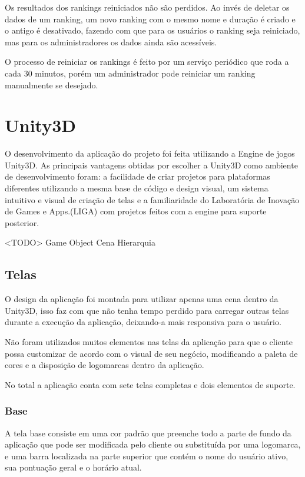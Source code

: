 Os resultados dos rankings reiniciados não são perdidos. Ao invés de deletar os dados de um ranking, um novo ranking com o mesmo nome e duração é criado e o antigo é desativado, fazendo com que para os usuários o ranking seja reiniciado, mas para os administradores os dados ainda são acessíveis.

O processo de reiniciar os rankings é feito por um serviço periódico que roda a cada 30 minutos, porém um administrador pode reiniciar um ranking manualmente se desejado.

\section{Unity3D}
\label{sec:unity3d}

O desenvolvimento da aplicação do projeto foi feita utilizando a Engine de jogos Unity3D. As principais vantagens obtidas por escolher a Unity3D como ambiente de desenvolvimento foram: a facilidade de criar projetos
para plataformas diferentes utilizando a mesma base de código e design visual, um sistema intuitivo e visual de criação de telas e a familiaridade do Laboratória de Inovação de Games e Apps.(LIGA) com projetos feitos com a engine para suporte posterior.

<TODO>
Game Object
Cena
Hierarquia

\subsection{Telas}
\label{subsec:telas}

O design da aplicação foi montada para utilizar apenas uma cena dentro da Unity3D, isso faz com que não tenha tempo perdido para carregar outras telas durante a execução da aplicação, deixando-a mais responsiva para o usuário.

Não foram utilizados muitos elementos nas telas da aplicação para que o cliente possa customizar de acordo com o visual de seu negócio, modificando a paleta de cores e a disposição de logomarcas dentro da aplicação.

No total a aplicação conta com sete telas completas e dois elementos de suporte.

\subsubsection{Base}
\label{subsubsec:base}

A tela base consiste em uma cor padrão que preenche todo a parte de fundo da aplicação que pode ser modificada pelo cliente ou substituída por uma logomarca, e uma barra localizada na parte superior que contém o nome do usuário ativo, sua pontuação geral e o horário atual.

